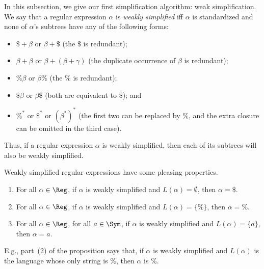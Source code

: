 In this subsection, we give our first simplification algorithm: weak
simplification.  We say that a regular expression $\alpha$ is
\emph{weakly simplified}
%
%
%
iff $\alpha$ is standardized and none of $\alpha$'s subtrees have
any of the following forms:
\begin{itemize}
\item $\$+\beta$ or $\beta+\$$ (the $\$$ is redundant);

\item $\beta+\beta$ or $\beta+(\beta+\gamma)$ (the duplicate occurrence
  of $\beta$ is redundant);

\item $\%\beta$ or $\beta\%$ (the $\%$ is redundant);

\item $\$\beta$ or $\beta\$$ (both are equivalent to $\$$); and

\item $\%^*$ or $\$^*$ or $(\beta^*)^*$ (the first two can be replaced
  by $\%$, and the extra closure can be omitted in the third case).
\end{itemize}
Thus, if a regular expression $\alpha$ is weakly simplified,
then each of its subtrees will also be weakly simplified.

Weakly simplified regular expressions have some pleasing properties.

\begin{proposition}
\label{WeakSimpProp3}
\begin{enumerate}[\quad(1)]
\item For all $\alpha\in\Reg$, if $\alpha$ is weakly simplified and
  $L(\alpha)=\emptyset$, then $\alpha=\$$.

\item For all $\alpha\in\Reg$, if $\alpha$ is weakly simplified and
  $L(\alpha)=\{\%\}$, then $\alpha=\%$.

\item For all $\alpha\in\Reg$, for all $a\in\Sym$, if $\alpha$ is
  weakly simplified and $L(\alpha)=\{a\}$, then $\alpha=a$.
\end{enumerate}
\end{proposition}

E.g., part~(2) of the proposition says that, if $\alpha$
is weakly simplified and $L(\alpha)$ is the language whose only
string is $\%$, then $\alpha$ is $\%$.


